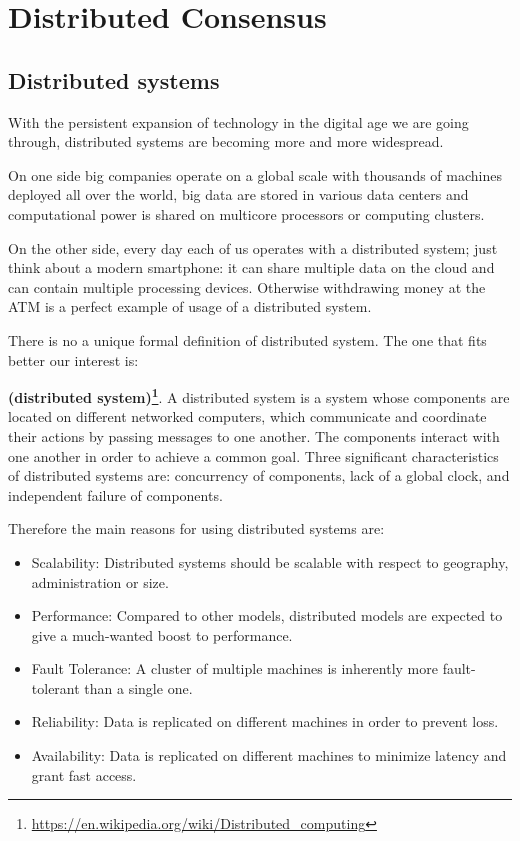 \chapter{Distributed Consensus}
\label{chpr:consensus}

\bigskip
\section{Distributed systems}
With the persistent expansion of technology in the digital age we are going through, distributed systems are becoming more and more widespread.

\bigskip
\noindent
On one side big companies operate on a global scale with thousands of machines deployed all over the world, big data are stored in various data centers and computational power is shared on multicore processors or computing clusters.

\bigskip
\noindent
On the other side, every day each of us operates with a distributed system; just think about a modern smartphone: it can share multiple data on the cloud and can contain multiple processing devices. Otherwise withdrawing money at the ATM is a perfect example of usage of a distributed system.

\bigskip
\noindent
There is no a unique formal definition of distributed system. The one that fits better our interest is:
\begin{mydef} {\bf (distributed system)\footnote{\url{https://en.wikipedia.org/wiki/Distributed_computing}}}.
    A distributed system is a system whose components are located on different networked computers, which communicate and coordinate their actions by passing messages to one another. The components interact with one another in order to achieve a common goal. Three significant characteristics of distributed systems are: concurrency of components, lack of a global clock, and independent failure of components.
\end{mydef}

\bigskip
\noindent
Therefore the main reasons for using distributed systems are:
\begin{itemize}
    \item Scalability: Distributed systems should be scalable with respect to geography, administration or size.
    \item Performance: Compared to other models, distributed models are expected to give a much-wanted boost to performance.
    \item Fault Tolerance: A cluster of multiple machines is inherently more fault-tolerant than a single one.
    \item Reliability: Data is replicated on different machines in order to prevent loss.
    \item Availability: Data is replicated on different machines to minimize latency and grant fast access.
\end{itemize}


